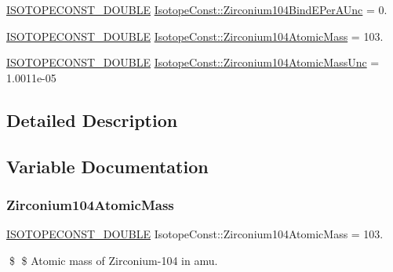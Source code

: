 \begin{DoxyCompactItemize}
\mbox{\hyperlink{group___isotope_const-_macros_ga8f45a7272ce02c0b4c65c44636ed719a}{I\+S\+O\+T\+O\+P\+E\+C\+O\+N\+S\+T\+\_\+\+D\+O\+U\+B\+LE}} \mbox{\hyperlink{group___isotope_const-_zirconium-_zr104_ga5486c96b5658a86105857937d31eb407}{Isotope\+Const\+::\+Zirconium104\+Bind\+E\+Per\+A\+Unc}} = 0.
\item 
\mbox{\hyperlink{group___isotope_const-_macros_ga8f45a7272ce02c0b4c65c44636ed719a}{I\+S\+O\+T\+O\+P\+E\+C\+O\+N\+S\+T\+\_\+\+D\+O\+U\+B\+LE}} \mbox{\hyperlink{group___isotope_const-_zirconium-_zr104_ga24058e27ca63b83b4dde875f149b6c67}{Isotope\+Const\+::\+Zirconium104\+Atomic\+Mass}} = 103.
\item 
\mbox{\hyperlink{group___isotope_const-_macros_ga8f45a7272ce02c0b4c65c44636ed719a}{I\+S\+O\+T\+O\+P\+E\+C\+O\+N\+S\+T\+\_\+\+D\+O\+U\+B\+LE}} \mbox{\hyperlink{group___isotope_const-_zirconium-_zr104_ga305d726f122c2b33c5b59c97cfd263fa}{Isotope\+Const\+::\+Zirconium104\+Atomic\+Mass\+Unc}} = 1.\+0011e-\/05
\end{DoxyCompactItemize}


\subsection{Detailed Description}


\subsection{Variable Documentation}
\mbox{\label{group___isotope_const-_zirconium-_zr104_ga24058e27ca63b83b4dde875f149b6c67}} 
\subsubsection{\texorpdfstring{Zirconium104\+Atomic\+Mass}{Zirconium104AtomicMass}}
{\footnotesize\ttfamily \mbox{\hyperlink{group___isotope_const-_macros_ga8f45a7272ce02c0b4c65c44636ed719a}{I\+S\+O\+T\+O\+P\+E\+C\+O\+N\+S\+T\+\_\+\+D\+O\+U\+B\+LE}} Isotope\+Const\+::\+Zirconium104\+Atomic\+Mass = 103.}

\$ \$ Atomic mass of Zirconium-\/104 in amu. \mbox{\label{group___isotope_const-_zirconium-_zr104_ga305d726f122c2b33c5b59c97cfd263fa}} 
